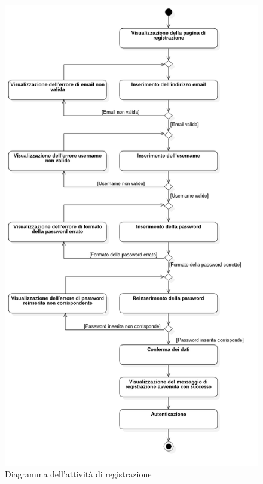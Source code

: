 \begin{figure}[!h]
	\centering
	\includegraphics[scale=0.5]{img/attivita/registrazione}  
	\caption{Diagramma dell'attività di registrazione}
\end{figure}

